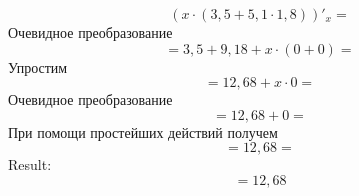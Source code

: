 \documentclass{article}
\begin{document}
 $$\left( x\cdot (3,5 + 5,1\cdot 1,8) \right)'_x= $$Очевидное преобразование $$=3,5 + 9,18 + x\cdot (0 + 0)= $$Упростим $$=12,68 + x\cdot 0= $$Очевидное преобразование $$=12,68 + 0= $$При помощи простейших действий получем $$=12,68= $$Result: $$=12,68 $$
\end{document}
